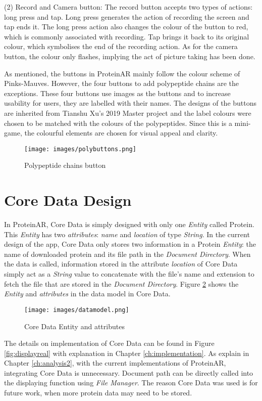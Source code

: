 (2) Record and Camera button: The record button accepts two types of actions: long press and tap. Long press generates the action of recording the screen and tap ends it. The long press action also changes the colour of the button to red, which is commonly associated with recording. Tap brings it back to its original colour, which symbolises the end of the recording action. As for the camera button, the colour only flashes, implying the act of picture taking has been done. 

As mentioned, the buttons in ProteinAR mainly follow the colour scheme of Pinks-Mauves. However, the four buttons to add polypeptide chains are the exceptions. These four buttons use images as the buttons and to increase usability for users, they are labelled with their names. The designs of the buttons are inherited from Tianshu Xu’s 2019 Master project \parencite{xu_interactive_2019} and the label colours were chosen to be matched with the colours of the polypeptides. Since this is a mini-game, the colourful elements are chosen for visual appeal and clarity. 
\begin{figure}[hbt!]
	\centering
	\texttt{[image: images/polybuttons.png]}
	\caption{Polypeptide chains button}
	\label{fig:polybuttons}
\end{figure}

\section{Core Data Design}
In ProteinAR, Core Data is simply designed with only one \emph{Entity} called Protein. This \emph{Entity} has two \emph{attributes}: \emph{name} and \emph{location} of type \emph{String}. In the current design of the app, Core Data only stores two information in a Protein \emph{Entity}: the name of downloaded protein and its file path in the \emph{Document Directory}. When the data is called, information stored in the attribute \emph{location} of Core Data simply act as a \emph{String} value to concatenate with the file's name and extension to fetch the file that are stored in the \emph{Document Directory}. 
Figure \ref{fig:datamodel} shows the \emph{Entity} and \emph{attributes} in the data model in Core Data.
 \begin{figure}[!htp]
	\centering
	\texttt{[image: images/datamodel.png]}
	\caption{Core Data Entity and attributes}
	\label{fig:datamodel}
\end{figure}

The details on implementation of Core Data can be found in Figure \ref{fig:displayreal} with explanation in Chapter \ref{ch:implementation}. As explain in Chapter \ref{ch:analysis2}, with the current implementations of ProteinAR, integrating Core Data is unnecessary. Document path can be directly called into the displaying function using \emph{File Manager}. The reason Core Data was used is for future work, when more protein data may need to be stored. 

